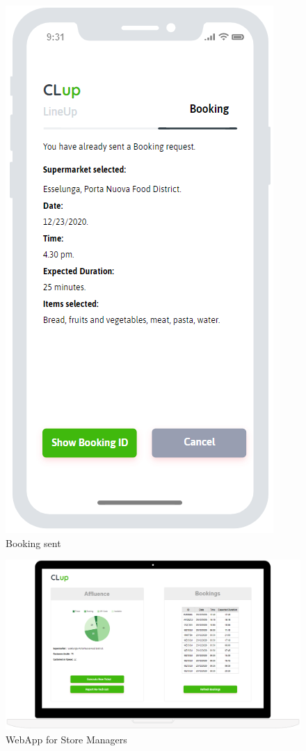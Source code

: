 \begin{figure}[H]
\begin{minipage}{0.3\linewidth}
\includegraphics[width=\textwidth]{./Images/MockupLogo/mockBookSent}
\caption{Booking sent}
\end{minipage}
\end{figure}
\begin{figure} 
\includegraphics[width=\textwidth]{./Images/MockupLogo/mockLaptop}
\caption{WebApp for Store Managers}
\end{figure}
